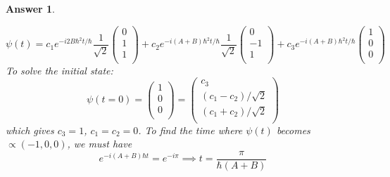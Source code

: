 \documentclass[a4paper]{article}
\newtheorem{ans}{Answer}[subsection]
\theoremstyle{new}
\begin{document}
\begin{ans}
\begin{enumerate}[label=(\roman*)]
$$\psi(t)=c_1e^{-i2B\hbar^2t/\hbar}\frac{1}{\sqrt{2}}\begin{pmatrix}0\\1\\1\\\end{pmatrix}+c_2e^{-i(A+B)\hbar^2t/\hbar}\frac{1}{\sqrt{2}}\begin{pmatrix}0\\-1\\1\\\end{pmatrix}+c_3e^{-i(A+B)\hbar^2t/\hbar}\begin{pmatrix}1\\0\\0\\\end{pmatrix}$$
To solve the initial state:
$$\psi(t=0)=\begin{pmatrix}1\\0\\0\\\end{pmatrix}=\begin{pmatrix}c_3\\(c_1-c_2)/\sqrt{2}\\(c_1+c_2)/\sqrt{2}\\\end{pmatrix}$$
which gives $c_3=1$, $c_1=c_2=0$. To find the time where $\psi(t)$ becomes $\propto(-1,0,0)$, we must have 
$$e^{-i(A+B)\hbar t}=e^{-i\pi}\implies t=\frac{\pi}{\hbar(A+B)}$$
\end{enumerate}
\end{ans}
\newpage
\end{document}
